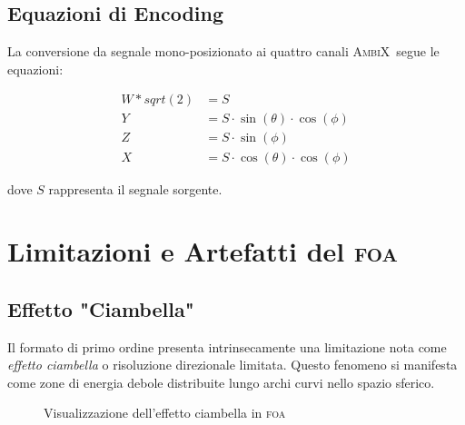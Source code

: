 \documentclass[a4paper,11pt,openany]{book}
\newcommand{\foa}{\textsc{foa}}
\newcommand{\ambix}{\textsc{AmbiX}}
\begin{document}
\subsection{Equazioni di Encoding}

La conversione da segnale mono-posizionato ai quattro canali \ambix\ segue le equazioni:

\begin{align}
W*sqrt(2) &= S \\
Y &= S \cdot \sin(\theta) \cdot \cos(\phi) \\
Z &= S \cdot \sin(\phi) \\
X &= S \cdot \cos(\theta) \cdot \cos(\phi)
\end{align}

dove $S$ rappresenta il segnale sorgente.

\section{Limitazioni e Artefatti del \foa}

\subsection{Effetto "Ciambella"}

Il formato di primo ordine presenta intrinsecamente una limitazione nota come \textit{effetto ciambella} o risoluzione direzionale limitata. Questo fenomeno si manifesta come zone di energia debole distribuite lungo archi curvi nello spazio sferico.

\begin{figure}[H]
    \centering
    \caption{Visualizzazione dell'effetto ciambella in \foa}
    \label{fig:donut_effect}
\end{figure}
\end{document}
